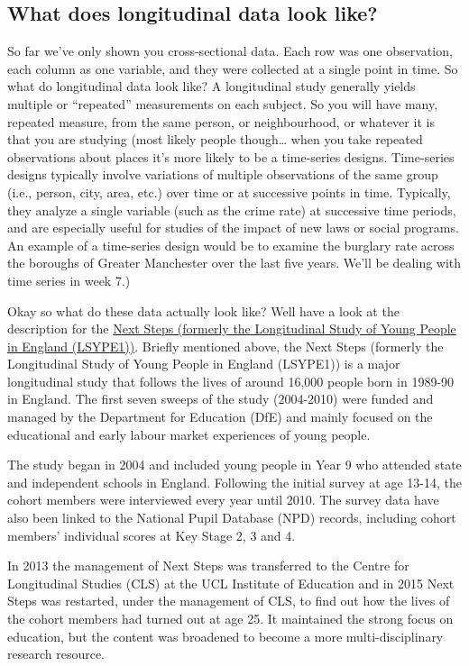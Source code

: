 \documentclass[]{book}
\theoremstyle{definition}
\theoremstyle{definition}
\theoremstyle{definition}
\theoremstyle{remark}
\begin{document}
\hypertarget{what-does-longitudinal-data-look-like}{%
\subsection{What does longitudinal data look
like?}\label{what-does-longitudinal-data-look-like}}

So far we've only shown you cross-sectional data. Each row was one
observation, each column as one variable, and they were collected at a
single point in time. So what do longitudinal data look like? A
longitudinal study generally yields multiple or ``repeated''
measurements on each subject. So you will have many, repeated measure,
from the same person, or neighbourhood, or whatever it is that you are
studying (most likely people though\ldots{} when you take repeated
observations about places it's more likely to be a time-series designs.
Time-series designs typically involve variations of multiple
observations of the same group (i.e., person, city, area, etc.) over
time or at successive points in time. Typically, they analyze a single
variable (such as the crime rate) at successive time periods, and are
especially useful for studies of the impact of new laws or social
programs. An example of a time-series design would be to examine the
burglary rate across the boroughs of Greater Manchester over the last
five years. We'll be dealing with time series in week 7.)

Okay so what do these data actually look like? Well have a look at the
description for the
\href{https://discover.ukdataservice.ac.uk/series/?sn=2000030}{Next
Steps (formerly the Longitudinal Study of Young People in England
(LSYPE1))}. Briefly mentioned above, the Next Steps (formerly the
Longitudinal Study of Young People in England (LSYPE1)) is a major
longitudinal study that follows the lives of around 16,000 people born
in 1989-90 in England. The first seven sweeps of the study (2004-2010)
were funded and managed by the Department for Education (DfE) and mainly
focused on the educational and early labour market experiences of young
people.

The study began in 2004 and included young people in Year 9 who attended
state and independent schools in England. Following the initial survey
at age 13-14, the cohort members were interviewed every year until 2010.
The survey data have also been linked to the National Pupil Database
(NPD) records, including cohort members' individual scores at Key Stage
2, 3 and 4.

In 2013 the management of Next Steps was transferred to the Centre for
Longitudinal Studies (CLS) at the UCL Institute of Education and in 2015
Next Steps was restarted, under the management of CLS, to find out how
the lives of the cohort members had turned out at age 25. It maintained
the strong focus on education, but the content was broadened to become a
more multi-disciplinary research resource.
\end{document}
